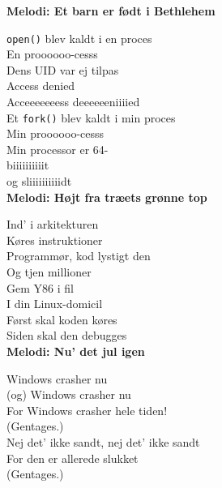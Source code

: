 \newpage


\vspace{-2.5mm}
\textbf{Melodi: Et barn er født i Bethlehem}

\texttt{open()} blev kaldt i en proces\\
En proooooo-cesss\\
Dens UID var ej tilpas\\
Access denied\\
Acceeeeeeess deeeeeeniiiied\\
Et \texttt{fork()} blev kaldt i min proces\\
Min proooooo-cesss\\
Min processor er 64-\\
biiiiiiiiiit\\
og sliiiiiiiiiidt\\


\vspace{-2.5mm}
\textbf{Melodi: Højt fra træets grønne top}

Ind' i arkitekturen\\
Køres instruktioner\\
Programmør, kod lystigt den\\
Og tjen millioner\\
Gem Y86 i fil\\
I din Linux-domicil\\
Først skal koden køres\\
Siden skal den debugges\\


\vspace{-2.5mm}
\textbf{Melodi: Nu' det jul igen}

Windows crasher nu\\
(og) Windows crasher nu\\
For Windows crasher hele tiden!\\
(Gentages.)\\
Nej det' ikke sandt, nej det' ikke sandt\\
For den er allerede slukket\\
(Gentages.)
